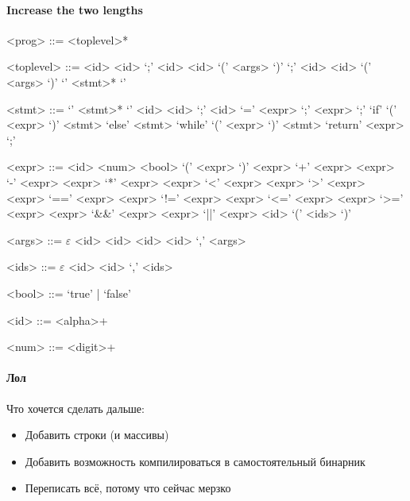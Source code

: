 \documentclass{article}
\begin{document}
\paragraph{Increase the two lengths}
\setlength{\grammarparsep}{20pt plus 1pt minus 1pt} %
\setlength{\grammarindent}{12em} %

\begin{grammar}

<prog> ::= <toplevel>*

<toplevel> ::= <id> <id> `;'
\alt <id> <id> `(' <args> `)' `;'
\alt <id> <id> `(' <args> `)' `{' <stmt>* `}'

<stmt> ::= `{' <stmt>* `}'
\alt <id> <id> `;'
\alt <id> `=' <expr> `;'
\alt <expr> `;'
\alt `if' `(' <expr> `)' <stmt> `else' <stmt>
\alt `while' `(' <expr> `)' <stmt>
\alt `return' <expr> `;'

<expr> ::= <id> 
\alt <num>
\alt <bool>
\alt `(' <expr> `)'
\alt <expr> `+' <expr>
\alt <expr> `-' <expr>
\alt <expr> `*' <expr>
\alt <expr> `<' <expr>
\alt <expr> `>' <expr>
\alt <expr> `==' <expr>
\alt <expr> `!=' <expr>
\alt <expr> `<=' <expr>
\alt <expr> `>=' <expr>
\alt <expr> `&&' <expr>
\alt <expr> `||' <expr>
\alt <id> `(' <ids> `)'

<args> ::= $\varepsilon$
\alt <id> <id>
\alt <id> <id> `,' <args>

<ids> ::= $\varepsilon$
\alt <id>
\alt <id> `,' <ids>

<bool> ::= `true' | `false'

<id> ::= <alpha>+

<num> ::= <digit>+

\end{grammar}

\paragraph{Лол}

Что хочется сделать дальше:
\begin{itemize}
\item Добавить строки (и массивы)
\item Добавить возможность компилироваться в самостоятельный бинарник
\item Переписать всё, потому что сейчас мерзко
\end{itemize}
\end{document}
